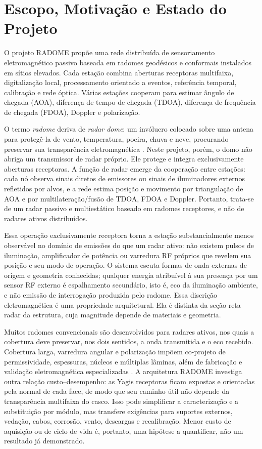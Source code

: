 \chapter{Escopo, Motivação e Estado do Projeto}

O projeto RADOME propõe uma rede distribuída de sensoriamento eletromagnético passivo baseada em radomes geodésicos e conformais instalados em sítios elevados. Cada estação combina aberturas receptoras multifaixa, digitalização local, processamento orientado a eventos, referência temporal, calibração e rede óptica. Várias estações cooperam para estimar ângulo de chegada (AOA), diferença de tempo de chegada (TDOA), diferença de frequência de chegada (FDOA), Doppler e polarização.

O termo \emph{radome} deriva de \emph{radar dome}: um invólucro colocado sobre uma antena para protegê-la de vento, temperatura, poeira, chuva e neve, procurando preservar sua transparência eletromagnética \cite{qamar2020}. Neste projeto, porém, o domo não abriga um transmissor de radar próprio. Ele protege e integra exclusivamente aberturas receptoras. A função de radar emerge da cooperação entre estações: cada nó observa sinais diretos de emissores ou sinais de iluminadores externos refletidos por alvos, e a rede estima posição e movimento por triangulação de AOA e por multilateração/fusão de TDOA, FDOA e Doppler. Portanto, trata-se de um radar passivo e multiestático baseado em radomes receptores, e não de radares ativos distribuídos.

Essa operação exclusivamente receptora torna a estação substancialmente menos observável no domínio de emissões do que um radar ativo: não existem pulsos de iluminação, amplificador de potência ou varredura RF próprios que revelem sua posição e seu modo de operação. O sistema escuta formas de onda externas de origem e geometria conhecidas; qualquer energia atribuível à sua presença por um sensor RF externo é espalhamento secundário, isto é, eco da iluminação ambiente, e não emissão de interrogação produzida pelo radome. Essa discrição eletromagnética é uma propriedade arquitetural. Ela é distinta da seção reta radar da estrutura, cuja magnitude depende de materiais e geometria.

Muitos radomes convencionais são desenvolvidos para radares ativos, nos quais a cobertura deve preservar, nos dois sentidos, a onda transmitida e o eco recebido. Cobertura larga, varredura angular e polarização impõem co-projeto de permissividade, espessuras, núcleos e múltiplas lâminas, além de fabricação e validação eletromagnética especializadas \cite{qamar2020,ramanamurthy2016}. A arquitetura RADOME investiga outra relação custo--desempenho: as Yagis receptoras ficam expostas e orientadas pela normal de cada face, de modo que seu caminho útil não depende da transparência multifaixa do casco. Isso pode simplificar a caracterização e a substituição por módulo, mas transfere exigências para suportes externos, vedação, cabos, corrosão, vento, descargas e recalibração. Menor custo de aquisição ou de ciclo de vida é, portanto, uma hipótese a quantificar, não um resultado já demonstrado.

